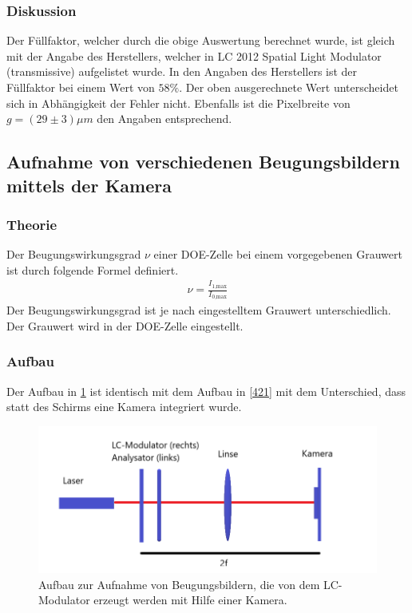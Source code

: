 \subsubsection{Diskussion}
Der Füllfaktor, welcher durch die obige Auswertung berechnet wurde, ist gleich mit der Angabe des Herstellers, welcher in LC 2012 Spatial Light Modulator (transmissive) aufgelistet wurde. In den Angaben des Herstellers ist der Füllfaktor bei einem Wert von $58 \%$. Der oben ausgerechnete Wert unterscheidet sich in Abhängigkeit der Fehler nicht. Ebenfalls ist die Pixelbreite von $g = (29 \pm 3) \mu m$ den Angaben entsprechend. 

\subsection{Aufnahme von verschiedenen Beugungsbildern mittels der Kamera}
\subsubsection{Theorie}
Der Beugungswirkungsgrad $\nu$ einer DOE-Zelle bei einem vorgegebenen Grauwert ist durch folgende Formel definiert.
\begin{align}
	\nu = \frac{I_\text{1,max}}{I_\text{0,max}}
	\label{fff}
\end{align}
Der Beugungswirkungsgrad ist je nach eingestelltem Grauwert unterschiedlich. Der Grauwert wird in der DOE-Zelle eingestellt.
\subsubsection{Aufbau}
Der Aufbau in \cref{423} ist identisch mit dem Aufbau in \cref{421} mit dem Unterschied, dass statt des Schirms eine Kamera integriert wurde.
\begin{figure}[h!]
	\centering
	\includegraphics[scale = 1]{Kamera111.png}
	\caption{Aufbau zur Aufnahme von Beugungsbildern, die von dem LC-Modulator erzeugt werden mit Hilfe einer Kamera.}
	\label{423}
\end{figure}
